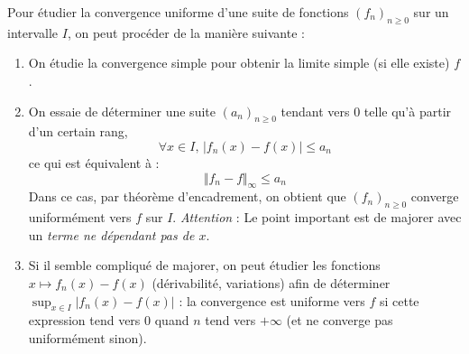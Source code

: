 \documentclass[french,11pt,twoside]{VcCours}
\begin{document}
\begin{Methode}{} Pour étudier la convergence uniforme d'une suite de fonctions $(f_n)_{n \geq 0}$  sur un intervalle $I$, on peut procéder de la manière suivante :

\begin{enumerate}
\item On étudie la convergence simple pour obtenir la limite simple (si elle existe) $f$.
\item On essaie de déterminer une suite $(a_n)_{n \geq 0}$ tendant vers $0$ telle qu'à partir d'un certain rang,
$$ \forall x \in I, \, \vert f_n(x)-f(x) \vert \leq a_n$$
ce qui est équivalent à :
$$ \Vert f_n - f \Vert_{\infty} \leq a_n$$
Dans ce cas, par théorème d'encadrement, on obtient que $(f_n)_{n \geq 0}$ converge uniformément vers $f$ sur $I$. \emph{Attention} : Le point important est de majorer avec un \emph{terme ne dépendant pas de $x$}.
\item Si il semble compliqué de majorer, on peut étudier les fonctions $x \mapsto f_n(x)-f(x)$ (dérivabilité, variations) afin de déterminer $\sup_{x \in I} \vert f_n(x)-f(x) \vert$ : la convergence est uniforme vers $f$ si cette expression tend vers $0$ quand $n$ tend vers $+ \infty$ (et ne converge pas uniformément sinon). 
\end{enumerate}
\end{Methode}
\end{document}
